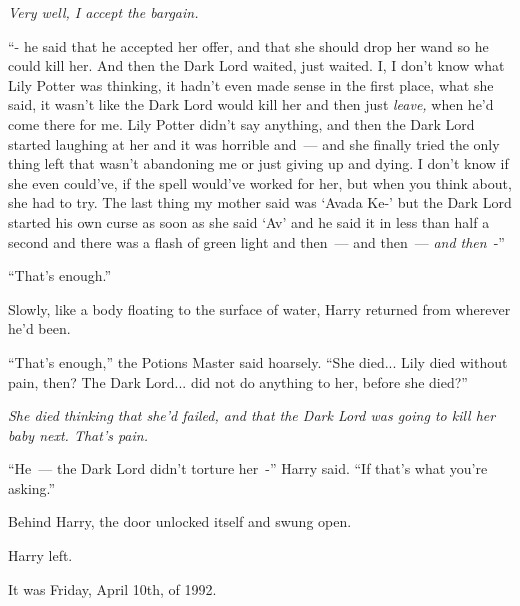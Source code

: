 \emph{Very well, I accept the bargain.}

``- he said that he accepted her offer, and that she should drop her wand so he could kill her. And then the Dark Lord waited, just waited. I, I don't know what Lily Potter was thinking, it hadn't even made sense in the first place, what she said, it wasn't like the Dark Lord would kill her and then just \emph{leave,} when he'd come there for me. Lily Potter didn't say anything, and then the Dark Lord started laughing at her and it was horrible and~--- and she finally tried the only thing left that wasn't abandoning me or just giving up and dying. I don't know if she even could've, if the spell would've worked for her, but when you think about, she had to try. The last thing my mother said was `Avada Ke-' but the Dark Lord started his own curse as soon as she said `Av' and he said it in less than half a second and there was a flash of green light and then~--- and then~--- \emph{and then}~-''

``That's enough.''

Slowly, like a body floating to the surface of water, Harry returned from wherever he'd been.

``That's enough,'' the Potions Master said hoarsely. ``She died... Lily died without pain, then? The Dark Lord... did not do anything to her, before she died?''

\emph{She died thinking that she'd failed, and that the Dark Lord was going to kill her baby next. That's pain.}

``He~--- the Dark Lord didn't torture her~-'' Harry said. ``If that's what you're asking.''

Behind Harry, the door unlocked itself and swung open.

Harry left.

It was Friday, April 10th, of 1992.
